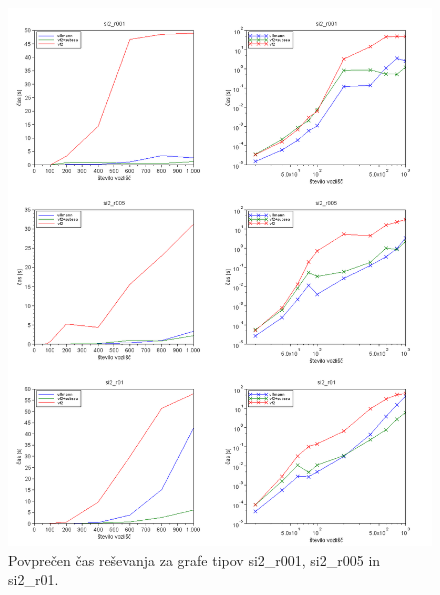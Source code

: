 \documentclass[a4paper, 12pt, ]{book}
\begin{document}
\begin{figure}
\begin{center}
\includegraphics[width=15cm]{img/results2_si2.png}
\end{center}
\caption{Povprečen čas reševanja za grafe tipov si2\_r001, si2\_r005 in si2\_r01.}
\label{pic_res2_si2}
\end{figure}
\end{document}
